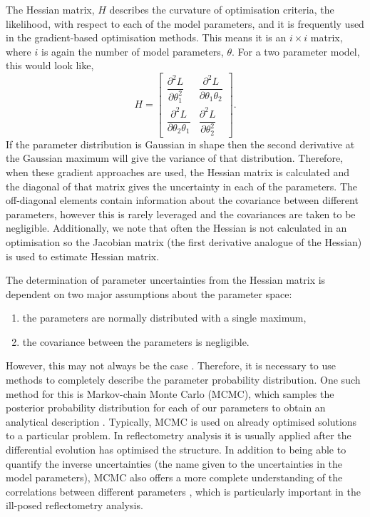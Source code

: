 \documentclass[
 reprint,
 superscriptaddress,
 amsmath,amssymb,
 aps,
]{revtex4-1}
\begin{document}
The Hessian matrix, $H$ describes the curvature of optimisation criteria, the likelihood, with respect to each of the model parameters, and it is frequently used in the gradient-based optimisation methods.
This means it is an $i\times i$ matrix, where $i$ is again the number of model parameters, $\theta$. For a two parameter model, this would look like,
%
\begin{equation}
    H =
    \left[\begin{matrix}
        \dfrac{\partial^2 L}{\partial \theta_{1}^2} & \dfrac{\partial^2 L}{\partial \theta_1 \theta_2} \\[6pt]
        \dfrac{\partial^2 L}{\partial \theta_2 \theta_1} & \dfrac{\partial^2 L}{\partial \theta_{2}^2}
    \end{matrix}\right].
\end{equation}
%
If the parameter distribution is Gaussian in shape then the second derivative at the Gaussian maximum will give the variance of that distribution.
Therefore, when these gradient approaches are used, the Hessian matrix is calculated and the diagonal of that matrix gives the uncertainty in each of the parameters.
The off-diagonal elements contain information about the covariance between different parameters, however this is rarely leveraged and the covariances are taken to be negligible.
Additionally, we note that often the Hessian is not calculated in an optimisation so the Jacobian matrix (the first derivative analogue of the Hessian) is used to estimate Hessian matrix.

The determination of parameter uncertainties from the Hessian matrix is dependent on two major assumptions about the parameter space:
\begin{enumerate}
    \item {the parameters are normally distributed with a single maximum,}
    \item {the covariance between the parameters is negligible.}
\end{enumerate}
However, this may not always be the case \cite{mccluskey_bayesian_2019}. Therefore, it is necessary to use methods to completely describe the parameter probability distribution.
One such method for this is Markov-chain Monte Carlo (MCMC), which samples the posterior probability distribution for each of our parameters to obtain an analytical description \cite{sivia_data_2006}.
Typically, MCMC is used on already optimised solutions to a particular problem. In reflectometry analysis it is usually applied after the differential evolution has optimised the structure.
In addition to being able to quantify the inverse uncertainties (the name given to the uncertainties in the model parameters), MCMC also offers a more complete understanding of the correlations between different parameters \cite{gilks_markov_1995}, which is particularly important in the ill-posed reflectometry analysis.
\end{document}
